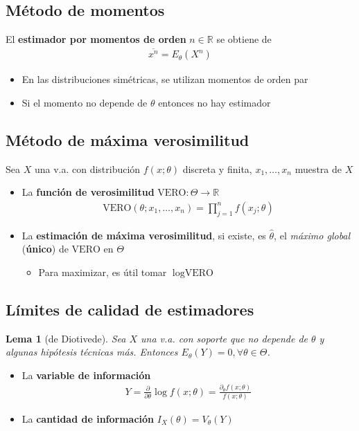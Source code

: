 \documentclass[a4paper,twocolumn]{extarticle}
\newtheorem*{lem}{Lema}
\theoremstyle{remark}
\newcommand{\R}{\mathbb{R}}
\newcommand{\vero}{\text{VERO}}
\begin{document}
\subsection{Método de momentos}
El \textbf{estimador por momentos de orden} $n \in \R$ se obtiene de
\begin{align*}
	\overline{x^n} = E_\theta(X^n)
\end{align*}

\begin{itemize}
	\item En las distribuciones simétricas, se utilizan momentos de orden par
	\item Si el momento no depende de $\theta$ entonces no hay estimador
\end{itemize}

\subsection{Método de máxima verosimilitud}
Sea $X$ una v.a. con distribución $f(x; \theta)$ discreta y finita, $x_1, \dots, x_n$ muestra de $X$
\begin{itemize}
	\item La \textbf{función de verosimilitud} $\vero: \Theta \to \R$
	\begin{align*}
		\vero(\theta; x_1, \dots, x_n) = \prod_{j=1}^{n} f(x_j; \theta)
	\end{align*}
	\item La \textbf{estimación de máxima verosimilitud}, si existe, es $\widehat{\theta}$, el \textit{máximo global} (\textbf{único}) de $\vero$ en $\Theta$
	\begin{itemize}
		\item Para maximizar, es útil tomar $\log \vero$
	\end{itemize}
\end{itemize}



\subsection{Límites de calidad de estimadores}

\begin{lem}
	[de Diotivede]
	Sea $X$ una v.a. con soporte que no depende de $\theta$ y algunas hipótesis técnicas más. Entonces $E_\theta(Y) = 0, \forall \theta \in \Theta$.
\end{lem}

\begin{itemize}
	\item La \textbf{variable de información}
	\begin{align*}
		Y = \frac{\partial}{\partial \theta} \log f(x; \theta) = \frac{\partial_\theta f(x; \theta)}{f(x; \theta)}
	\end{align*}
	\item La \textbf{cantidad de información} $I_X(\theta) = V_\theta(Y)$
\end{itemize}
\end{document}
